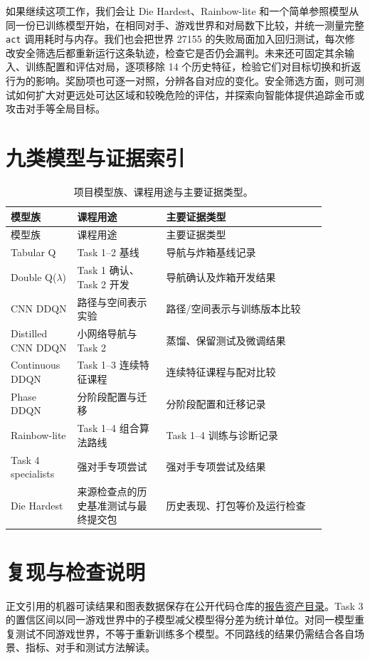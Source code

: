 \documentclass[UTF8,11pt,a4paper,fontset=none]{ctexart}
\begin{document}
如果继续这项工作，我们会让 Die Hardest、Rainbow-lite 和一个简单参照模型从同一份已训练模型开始，在相同对手、游戏世界和对局数下比较，并统一测量完整 \texttt{act} 调用耗时与内存。我们也会把世界 27155 的失败局面加入回归测试，每次修改安全筛选后都重新运行这条轨迹，检查它是否仍会漏判。未来还可固定其余输入、训练配置和评估对局，逐项移除 14 个历史特征，检验它们对目标切换和折返行为的影响。奖励项也可逐一对照，分辨各自对应的变化。安全筛选方面，则可测试如何扩大对更远处可达区域和较晚危险的评估，并探索向智能体提供追踪金币或攻击对手等全局目标。




\appendix
\section{九类模型与证据索引}
\small
\begin{longtable}{p{0.18\linewidth}p{0.25\linewidth}p{0.45\linewidth}}
\caption{项目模型族、课程用途与主要证据类型。}\label{tab:inventory}\\
\toprule 模型族 & 课程用途 & 主要证据类型\\\midrule\endfirsthead
\toprule 模型族 & 课程用途 & 主要证据类型\\\midrule\endhead
Tabular Q & Task 1--2 基线 & 导航与炸箱基线记录\\
Double Q($\lambda$) & Task 1 确认、Task 2 开发 & 导航确认及炸箱开发结果\\
CNN DDQN & 路径与空间表示实验 & 路径/空间表示与训练版本比较\\
Distilled CNN DDQN & 小网络导航与 Task 2 & 蒸馏、保留测试及微调结果\\
Continuous DDQN & Task 1--3 连续特征课程 & 连续特征课程与配对比较\\
Phase DDQN & 分阶段配置与迁移 & 分阶段配置和迁移记录\\
Rainbow-lite & Task 1--4 组合算法路线 & Task 1--4 训练与诊断记录\\
Task 4 specialists & 强对手专项尝试 & 强对手专项尝试及结果\\
Die Hardest & 来源检查点的历史基准测试与最终提交包 & 历史表现、打包等价及运行检查\\
\bottomrule
\end{longtable}
\normalsize

\section{复现与检查说明}
正文引用的机器可读结果和图表数据保存在公开代码仓库的\href{https://github.com/Jyangwakeup/MLE_final_project/tree/main/thesis/report-assets}{报告资产目录}。Task 3 的置信区间以同一游戏世界中的子模型减父模型得分差为统计单位。对同一模型重复测试不同游戏世界，不等于重新训练多个模型。不同路线的结果仍需结合各自场景、指标、对手和测试方法解读。
\end{document}
